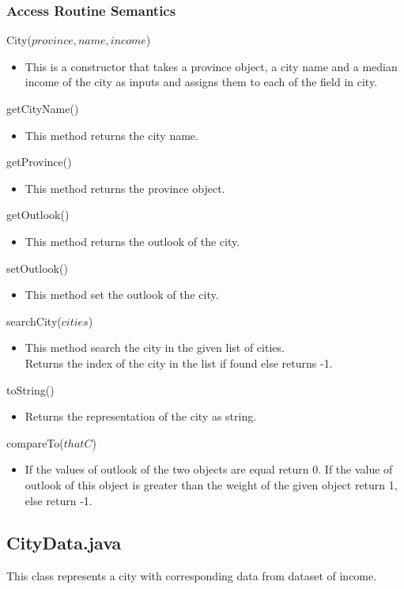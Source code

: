\documentclass[12pt,fleqn]{article}
\begin{document}
\subsubsection*{Access Routine Semantics}
\noindent City($province, name, income$)
\begin{itemize}
\item This is a constructor that takes a province object, a city name and a median income of the city as inputs
and assigns them to each of the field in city.
\end{itemize}
\noindent getCityName()
\begin{itemize}
\item This method returns the city name.
\end{itemize}
\noindent getProvince()
\begin{itemize}
\item This method returns the province object.
\end{itemize}
\noindent getOutlook()
\begin{itemize}
\item This method returns the outlook of the city.
\end{itemize}
\noindent setOutlook()
\begin{itemize}
\item This method set the outlook of the city.
\end{itemize}
\noindent searchCity($cities$)
\begin{itemize}
\item This method search the city in the given list of cities.
\\Returns the index of the city in the list if found else returns -1.
\end{itemize}
\noindent toString()
\begin{itemize}
\item Returns the representation of the city as string.
\end{itemize}
\noindent compareTo($thatC$)
\begin{itemize}
\item If the values of outlook of the two objects are equal return 0. If the value of outlook of this object is
greater than the weight of the given object return 1, else return -1.
\end{itemize}


\subsection*{CityData.java}\label{cityd}
This class represents a city with corresponding data from dataset of income.
\end{document}

